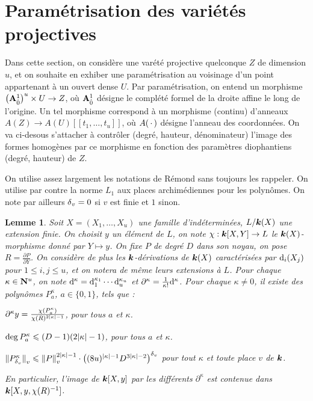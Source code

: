 \documentclass[11pt, twoside, a4paper]{article}
\newtheorem{lem}[thm]{Lemme} \newtheorem{coro}[thm]{Corollaire}
\theoremstyle{definition}
\begin{document}
\section{Paramétrisation des variétés projectives}

Dans cette section, on considère une varété projective quelconque $Z$ de
dimension $u$, et on souhaite en exhiber une paramétrisation au voisinage d'un
point appartenant à un ouvert dense $U$. Par paramétrisation, on entend un
morphisme $\big(\mathbf{A}^1_{\hat{0}}\big)^u \times U \to Z$, où $\mathbf{A}^1_{\hat{0}}$
désigne le complété formel de la droite affine le long de l'origine. Un tel
morphisme correspond à un morphisme (continu) d'anneaux $A(Z) \to A(U)[[t_1,
\ldots, t_u]]$, où $A({\,\cdot\,})$ désigne l'anneau des coordonnées. On va ci-desous
s'attacher à contrôler (degré, hauteur, dénominateur) l'image des formes
homogènes par ce morphisme en fonction des paramètres diophantiens (degré,
hauteur) de $Z$.

On utilise assez largement les notations de Rémond sans toujours les rappeler.
On utilise par contre la norme $L_1$ aux places archimédiennes pour les
polynômes. On note par ailleurs ${\delta\smash{_v}} = 0$ si $v$ est finie et $1$ sinon.

\begin{lem}
  Soit $X = (X_1, \dots, X_u)$ une famille d'indéterminées, $L / \boldsymbol{k}(X)$ une
  extension finie. On choisit $y$ un élément de $L$, on note $\chi : \boldsymbol{k}[X, Y]
  \to L$ le $\boldsymbol{k}(X)$-morphisme donné par $Y \mapsto y$. On fixe $P$ de degré
  $D$ dans son noyau, on pose $R = \frac{\partial P}{\partial Y}$. On considère
  de plus les $\boldsymbol{k}$-dérivations de $\boldsymbol{k}(X)$ caractérisées par $\mathrm d_i(X_j)$
  pour $1 \le i, j \le u$, et on notera de même leurs extensions à $L$. Pour
  chaque $\kappa \in \mathbf{N}^u$, on note $\mathrm d^\kappa = \mathrm d_1^{\kappa_1}\cdots
  \mathrm d_u^{\kappa_u}$ et $\partial^\kappa = \frac1{\kappa!}\mathrm d^\kappa$. Pour
  chaque $\kappa \neq 0$, il existe des polynômes $P_a^\kappa$, $a \in \{0,
  1\}$, tels que :
  \begin{enumthm}
    \item $\partial^\kappa y =
      \frac{\chi(P_a^\kappa)}{\chi(R)^{2{\lvert\kappa\rvert}-1}}$, \label{i-repres}
      pour tous $a$ et $\kappa$.
    \item $\deg P_a^\kappa \leqslant (D -1)(2 {\lvert\kappa\rvert} -1)$,
      pour tous $a$ et $\kappa$.
    \item $\left\lVert P_{\delta\smash{_v}}^{\kappa}\right\rVert_{v} \leqslant \left\lVert P\right\rVert_{v} ^{2{\lvert\kappa\rvert} - 1}
  	  \cdot \left((8u)^{{\lvert\kappa\rvert} -1} D^{3{\lvert\kappa\rvert} -2} \right)^{\delta\smash{_v}}$
      pour tout $\kappa$ et toute place $v$ de $\boldsymbol{k}$.
  \end{enumthm}
  En particulier, l'image de $\boldsymbol{k}[X, y]$ par les différents $\partial^\kappa$
  est contenue dans $\boldsymbol{k}[X, y, \chi(R)^{-1}]$.
\end{lem}
\end{document}
